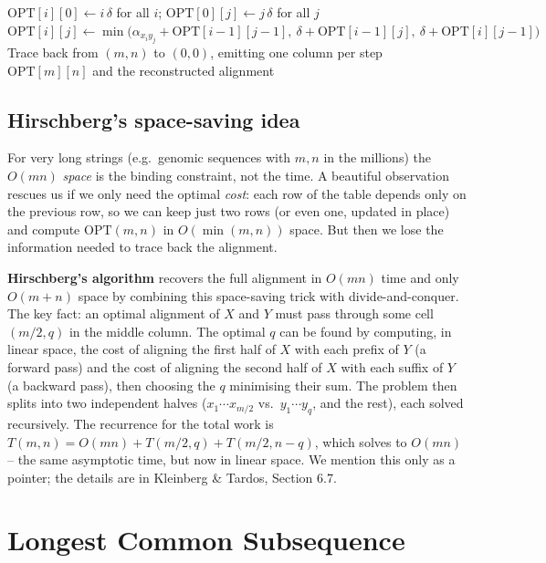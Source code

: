 \documentclass[11pt]{article}
\begin{document}
\begin{algorithm}[h]
\caption{Sequence Alignment (fill table, then trace back)}
\begin{algorithmic}[1]
\State $\mathrm{OPT}[i][0] \gets i\,\delta$ for all $i$; \quad $\mathrm{OPT}[0][j] \gets j\,\delta$ for all $j$
        \State $\mathrm{OPT}[i][j] \gets \min\big(\alpha_{x_i y_j} + \mathrm{OPT}[i-1][j-1],\ \delta + \mathrm{OPT}[i-1][j],\ \delta + \mathrm{OPT}[i][j-1]\big)$
    \EndFor
\EndFor
\State Trace back from $(m,n)$ to $(0,0)$, emitting one column per step
\State \Return $\mathrm{OPT}[m][n]$ and the reconstructed alignment
\end{algorithmic}
\end{algorithm}

\subsection{Hirschberg's space-saving idea}

For very long strings (e.g.\ genomic sequences with $m,n$ in the millions) the $O(mn)$
\emph{space} is the binding constraint, not the time. A beautiful observation rescues us if
we only need the optimal \emph{cost}: each row of the table depends only on the previous
row, so we can keep just two rows (or even one, updated in place) and compute
$\mathrm{OPT}(m,n)$ in $O(\min(m,n))$ space. But then we lose the information needed to
trace back the alignment.

\textbf{Hirschberg's algorithm} recovers the full alignment in $O(mn)$ time and only
$O(m+n)$ space by combining this space-saving trick with divide-and-conquer. The key fact:
an optimal alignment of $X$ and $Y$ must pass through some cell $(m/2, q)$ in the middle
column. The optimal $q$ can be found by computing, in linear space, the cost of aligning the
first half of $X$ with each prefix of $Y$ (a forward pass) and the cost of aligning the
second half of $X$ with each suffix of $Y$ (a backward pass), then choosing the $q$
minimising their sum. The problem then splits into two independent halves
($x_1\cdots x_{m/2}$ vs.\ $y_1\cdots y_q$, and the rest), each solved recursively. The
recurrence for the total work is $T(m,n) = O(mn) + T(m/2, q) + T(m/2, n-q)$, which solves to
$O(mn)$ -- the same asymptotic time, but now in linear space. We mention this only as a
pointer; the details are in Kleinberg \& Tardos, Section 6.7.

\section{Longest Common Subsequence}
\end{document}
